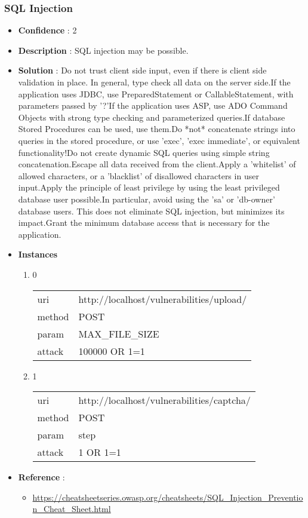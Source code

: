 \documentclass[10pt]{article}
\begin{document}
\subsubsection{SQL Injection}
\begin{itemize}
\item[] \textbf{Confidence} : 2
\item[] \textbf{Description} : SQL injection may be possible.
\item[] \textbf{Solution} :  Do not trust client side input, even if there is client side validation in place.  In general, type check all data on the server side.If the application uses JDBC, use PreparedStatement or CallableStatement, with parameters passed by '?'If the application uses ASP, use ADO Command Objects with strong type checking and parameterized queries.If database Stored Procedures can be used, use them.Do *not* concatenate strings into queries in the stored procedure, or use 'exec', 'exec immediate', or equivalent functionality!Do not create dynamic SQL queries using simple string concatenation.Escape all data received from the client.Apply a 'whitelist' of allowed characters, or a 'blacklist' of disallowed characters in user input.Apply the principle of least privilege by using the least privileged database user possible.In particular, avoid using the 'sa' or 'db-owner' database users. This does not eliminate SQL injection, but minimizes its impact.Grant the minimum database access that is necessary for the application.
\item[] \textbf{Instances}
\begin{enumerate}
\item[] 0
\begin{tabular}{| l | p{12cm}}
uri & http://localhost/vulnerabilities/upload/ \\
method & POST \\
param & MAX\_FILE\_SIZE \\
attack & 100000 OR 1=1 \\
\end{tabular}
\item[] 1
\begin{tabular}{| l | p{12cm}}
uri & http://localhost/vulnerabilities/captcha/ \\
method & POST \\
param & step \\
attack & 1 OR 1=1 \\
\end{tabular}
\end{enumerate}
\item[] \textbf{Reference} : 
\begin{itemize}
\item \url{https://cheatsheetseries.owasp.org/cheatsheets/SQL\_Injection\_Prevention\_Cheat\_Sheet.html}
\end{itemize}
\end{itemize}
\end{document}
